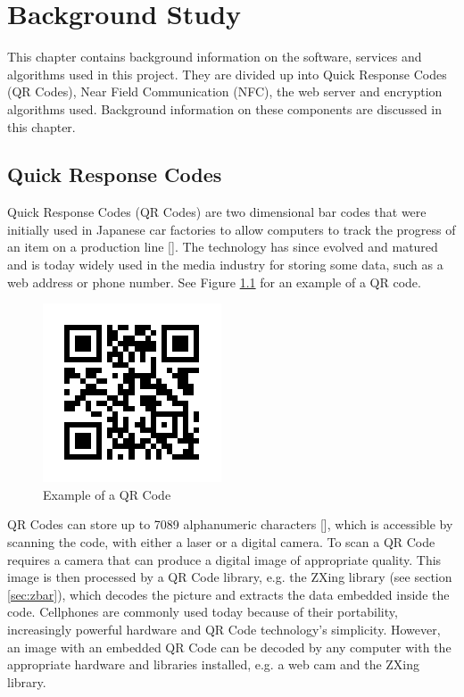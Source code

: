 \chapter{Background Study}

This chapter contains background information on the software, services and algorithms used
in this project. They are divided up into Quick Response Codes (QR Codes), Near Field
Communication (NFC), the web server and encryption algorithms used. Background
information on these components are discussed in this chapter. 

\section{Quick Response Codes}

Quick Response Codes (QR Codes) are two dimensional bar codes that were initially
 used in Japanese car factories to allow computers to track the progress of
 an item on a production line [\cite{website:denso-qrcode}]. The technology has
 since evolved and matured and is today widely used in the media industry for storing some
 data, such as a web address or phone number. See Figure \ref{qrcode} for an example of a QR
 code.
 
\begin{figure}[h]
\centering
\includegraphics[scale = 0.7]{qrcode_voorbeeld.png}
\caption{Example of a QR Code}
\label{qrcode}
\end{figure}
 
 QR Codes can store up to 7089 alphanumeric characters [\cite{journal:qr-code}], which is
 accessible by scanning the code, with either a laser or a digital camera. To scan a QR Code
 requires a camera that can produce a digital image of appropriate quality. This image is then
 processed by a QR Code library, e.g.
 the ZXing library (see section \ref{sec:zbar}), which decodes the picture and extracts the
 data embedded inside the code. Cellphones are commonly used today because of their
 portability, increasingly powerful hardware and QR Code technology's simplicity.
 However, an image with an embedded QR Code can be decoded by any computer with the
 appropriate hardware and libraries installed, e.g. a web cam and the ZXing library.

